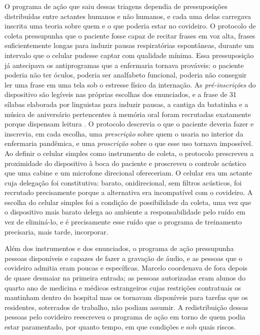 O programa de ação que saiu dessas triagens dependia de pressuposições distribuídas entre actantes humanos e não humanos, e cada uma delas carregava inscrita uma teoria sobre quem e o que poderia estar no covideiro. O protocolo de coleta pressupunha que o paciente fosse capaz de recitar frases em voz alta, frases suficientemente longas para induzir pausas respiratórias espontâneas, durante um intervalo que o celular pudesse captar com qualidade mínima. Essa pressuposição já antecipava os antiprogramas que a enfermaria tornava prováveis: o paciente poderia não ter óculos, poderia ser analfabeto funcional, poderia não conseguir ler uma frase em uma tela sob o estresse físico da internação. As \textit{pré-inscrições} do dispositivo são legíveis nas próprias escolhas dos enunciados, e a frase de 31 sílabas elaborada por linguistas para induzir pausas, a cantiga da batatinha e a música de aniversário pertencentes à memória oral foram recrutadas exatamente porque dispensam leitura \parencite{Akrich1992Description}. O protocolo descrevia o que o paciente deveria fazer e inscrevia, em cada escolha, uma \textit{prescrição} sobre quem o usaria no interior da enfermaria pandêmica, e uma \textit{proscrição} sobre o que esse uso tornava impossível. Ao definir o celular simples como instrumento de coleta, o protocolo prescreveu a proximidade do dispositivo à boca do paciente e proscreveu o controle acústico que uma cabine e um microfone direcional ofereceriam. O celular era um actante cuja delegação foi constitutiva: barato, onidirecional, sem filtros acústicos, foi recrutado precisamente porque a alternativa era incompatível com o covideiro. A escolha do celular simples foi a condição de possibilidade da coleta, uma vez que o dispositivo mais barato delega ao ambiente a responsabilidade pelo ruído em vez de eliminá-lo, e é precisamente esse ruído que o programa de treinamento precisaria, mais tarde, incorporar.

Além dos instrumentos e dos enunciados, o programa de ação pressupunha pessoas disponíveis e capazes de fazer a gravação de áudio, e as pessoas que o covideiro admitia eram poucas e específicas. Marcelo coordenava de fora depois de quase desmaiar na primeira entrada; as pessoas autorizadas eram alunos do quarto ano de medicina e médicos estrangeiros cujas restrições contratuais os mantinham dentro do hospital mas os tornavam disponíveis para tarefas que os residentes, soterrados de trabalho, não podiam assumir. A redistribuição dessas pessoas pelo covideiro reescreveu o programa de ação em torno de quem podia estar paramentado, por quanto tempo, em que condições e sob quais riscos.

